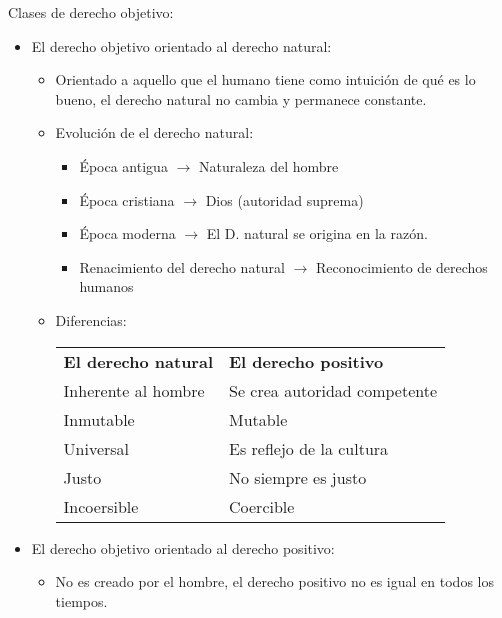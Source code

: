 \begin{itemize}
    Clases de derecho objetivo:
        \begin{itemize}
            \item El derecho objetivo orientado al derecho natural:
            \begin{itemize}
                \item Orientado a aquello que el humano tiene como intuición de qué es lo bueno, el derecho natural no cambia y permanece constante.
                \item Evolución de el derecho natural:
                \begin{itemize}
                    \item Época antigua $\rightarrow$ Naturaleza del hombre
                    \item Época cristiana $\rightarrow$ Dios (autoridad suprema)
                    \item Época moderna $\rightarrow$ El D. natural se origina en la razón.
                    \item Renacimiento del derecho natural $\rightarrow$ Reconocimiento de derechos humanos
                \end{itemize}

                
                \item Diferencias: \newline 
                \begin{tabular}{ | p{5cm} | p{5cm} | } 
                 \hline
                \textbf{El derecho natural} & \textbf{El derecho positivo} \\
                Inherente al hombre & Se crea autoridad competente \\ 
                Inmutable & Mutable \\ 
                Universal & Es reflejo de la cultura \\ 
                Justo & No siempre es justo \\ 
                Incoersible & Coercible \\ 
                 \hline
                \end{tabular}
                
            \end{itemize}

            \item El derecho objetivo orientado al derecho positivo:
            \begin{itemize}
                \item No es creado por el hombre, el derecho positivo no es igual en todos los tiempos.
            \end{itemize}


\end{itemize}
\end{itemize}
